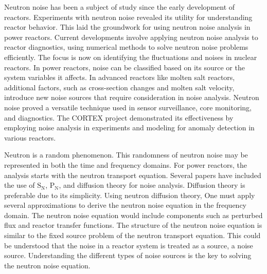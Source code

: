Neutron noise has been a subject of study since the early development of reactors. Experiments with neutron noise revealed its utility for understanding reactor behavior. This laid the groundwork for using neutron noise analysis in power reactors. Current developments involve applying neutron noise analysis to reactor diagnostics, using numerical methods to solve neutron noise problems efficiently. The focus is now on identifying the fluctuations and noises in nuclear reactors. In power reactors, noise can be classified based on its source or the system variables it affects. In advanced reactors like molten salt reactors, additional factors, such as cross-section changes and molten salt velocity, introduce new noise sources that require consideration in noise analysis. Neutron noise proved a versatile technique used in sensor surveillance, core monitoring, and diagnostics. The CORTEX project demonstrated its effectiveness by employing noise analysis in experiments and modeling for anomaly detection in various reactors. 

Neutron is a random phenomenon. This randomness of neutron noise may be represented in both the time and frequency domains. For power reactors, the analysis starts with the neutron transport equation. Several papers have included the use of $\text{S}_\text{N}$, $\text{P}_\text{N}$, and diffusion theory for noise analysis. Diffusion theory is preferable due to its simplicity. Using neutron diffusion theory, One must apply several approximations to derive the neutron noise equation in the frequency domain. The neutron noise equation would include components such as perturbed flux and reactor transfer functions. The structure of the neutron noise equation is similar to the fixed source problem of the neutron transport equation. This could be understood that the noise in a reactor system is treated as a source, a noise source. Understanding the different types of noise sources is the key to solving the neutron noise equation.

